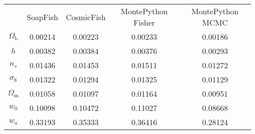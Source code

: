 \begin{table}
\centering
\begin{tabular}{|c|c|c|c|c|}
 & SoapFish & CosmicFish & MontePython Fisher & MontePython MCMC \\
$\Omega_\mathrm{b}$ & 0.00214 & 0.00223 & 0.00233 & 0.00186 \\
$h$ & 0.00382 & 0.00384 & 0.00376 & 0.00293 \\
$n_s$ & 0.01436 & 0.01453 & 0.01511 & 0.01272 \\
$\sigma_8$ & 0.01322 & 0.01294 & 0.01325 & 0.01129 \\
$\Omega_\mathrm{m}$ & 0.01058 & 0.01097 & 0.01164 & 0.00951 \\
$w_0$ & 0.10098 & 0.10472 & 0.11027 & 0.08668 \\
$w_a$ & 0.33193 & 0.35333 & 0.36416 & 0.28124 \\
\end{tabular}
\end{table}
